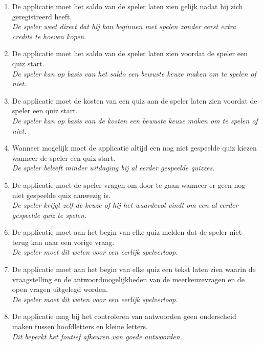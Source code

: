 \begin{enumerate}[label=\textbf{NFE\arabic*}.]
   \item De applicatie moet het saldo van de speler laten zien gelijk nadat hij zich geregistreerd heeft.
         \\ \textit{De speler weet direct dat hij kan beginnen met spelen zonder eerst extra credits te hoeven kopen.}

   \item De applicatie moet het saldo van de speler laten zien voordat de speler een quiz start.
         \\ \textit{De speler kan op basis van het saldo een bewuste keuze maken om te spelen of niet.}

   \item De applicatie moet de kosten van een quiz aan de speler laten zien voordat de speler een quiz start.
         \\ \textit{De speler kan op basis van de kosten een bewuste keuze maken om te spelen of niet.}

   \item Wanneer mogelijk moet de applicatie altijd een nog niet gespeelde quiz kiezen wanneer de speler een quiz start.
         \\ \textit{De speler beleeft minder uitdaging bij al eerder gespeelde quizzes.}

   \item De applicatie moet de speler vragen om door te gaan wanneer er geen nog niet gespeelde quiz aanwezig is.
         \\ \textit{De speler krijgt zelf de keuze of hij het waardevol vindt om een al eerder gespeelde quiz te spelen.}

   \item De applicatie moet aan het begin van elke quiz melden dat de speler niet terug kan naar een vorige vraag.
         \\ \textit{De speler moet dit weten voor een eerlijk spelverloop.}

   \item De applicatie moet aan het begin van elke quiz een tekst laten zien waarin de vraagstelling en de antwoordmogelijkheden van de meerkeuzevragen en de open vragen uitgelegd worden.
         \\ \textit{De speler moet dit weten voor een eerlijk spelverloop.}

   \item De applicatie mag bij het controleren van antwoorden geen onderscheid maken tussen hoofdletters en kleine letters.
         \\ \textit{Dit beperkt het foutief afkeuren van goede antwoorden.}


\end{enumerate}
